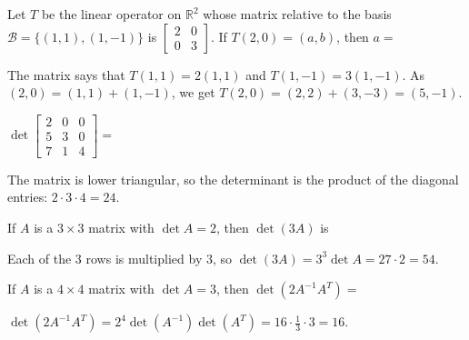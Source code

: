 \begin{question}[id=lt-20, marks=2]
Let $T$ be the linear operator on $\mathbb{R}^2$ whose matrix relative to the basis $\mathcal{B} = \{(1, 1), (1, -1)\}$ is $\begin{bmatrix} 2 & 0 \\ 0 & 3 \end{bmatrix}$. If $T(2, 0) = (a, b)$, then $a =$
\begin{solution}
The matrix says that $T(1, 1) = 2(1, 1)$ and $T(1, -1) = 3(1, -1)$. As $(2, 0) = (1, 1) + (1, -1)$, we get $T(2, 0) = (2, 2) + (3, -3) = (5, -1)$.
\end{solution}
\end{question}


\begin{question}[id=det-1]
$\det \begin{bmatrix} 2 & 0 & 0 \\ 5 & 3 & 0 \\ 7 & 1 & 4 \end{bmatrix} =$
\begin{solution}
The matrix is lower triangular, so the determinant is the product of the diagonal entries: $2 \cdot 3 \cdot 4 = 24$.
\end{solution}
\end{question}

\begin{question}[id=det-2]
If $A$ is a $3 \times 3$ matrix with $\det A = 2$, then $\det(3A)$ is
\begin{options}
\end{options}
\begin{solution}
Each of the 3 rows is multiplied by 3, so $\det(3A) = 3^3 \det A = 27 \cdot 2 = 54$.
\end{solution}
\end{question}

\begin{question}[id=det-3, marks=2]
If $A$ is a $4 \times 4$ matrix with $\det A = 3$, then $\det(2A^{-1}A^T) =$
\begin{solution}
$\det(2A^{-1}A^T) = 2^4 \det(A^{-1}) \det(A^T) = 16 \cdot \tfrac{1}{3} \cdot 3 = 16$.
\end{solution}
\end{question}

